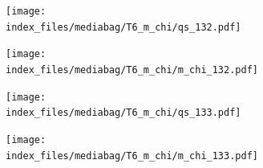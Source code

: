 \documentclass[
  11pt,
  letterpaper,
]{scrreprt}
\begin{document}
\begin{figure}

\begin{minipage}{0.50\linewidth}

\begin{figure}[H]

{\centering \texttt{[image: index\_files/mediabag/T6\_m\_chi/qs\_132.pdf]}

}


\end{figure}%

\end{minipage}%
%
\begin{minipage}{0.50\linewidth}

\begin{figure}[H]

{\centering \texttt{[image: index\_files/mediabag/T6\_m\_chi/m\_chi\_132.pdf]}

}


\end{figure}%

\end{minipage}%

\end{figure}%

\begin{figure}

\begin{minipage}{0.50\linewidth}

\begin{figure}[H]

{\centering \texttt{[image: index\_files/mediabag/T6\_m\_chi/qs\_133.pdf]}

}


\end{figure}%

\end{minipage}%
%
\begin{minipage}{0.50\linewidth}

\begin{figure}[H]

{\centering \texttt{[image: index\_files/mediabag/T6\_m\_chi/m\_chi\_133.pdf]}

}


\end{figure}%

\end{minipage}%

\end{figure}%
\end{document}
